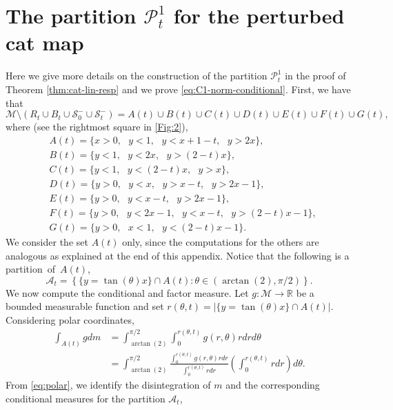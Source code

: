 \documentclass{amsart}
\numberwithin{equation}{section}
\newcommand\cA{{\mathcal A}}
\newcommand\cM{{\mathcal M}}
\newcommand\cS{{\mathcal S}}
\newcommand\bR{{\mathbb R}}
\begin{document}
\section{The partition \(\mathscr P_t^1\) for the perturbed cat map} \label{sec:app}
Here we give more details on the construction of the partition \(\mathscr P_t^1\) in the proof of Theorem \ref{thm:cat-lin-resp} and we prove \eqref{eq:C1-norm-conditional}. First, we have that 
\[
\cM \setminus (R_t \cup B_t \cup \cS_0^{-} \cup \cS_t^{-}) = A(t) \cup B(t) \cup C(t) \cup D(t) \cup E(t) \cup F(t) \cup G(t),
\]
where (see the rightmost square in \ref{Fig:2}),
\begin{equation}\label{eq:pedant}
\begin{split}
&A(t) = \{x>0, \text{ } y<1, \text{ } y<x+1-t, \text{ } y>2x\},\\
&B(t) = \{y<1,\text{ } y<2x, \text{ }y > (2-t)x\},\\
&C(t) = \{y<1,\text{ } y<(2-t)x,\text{ } y > x\},\\
&D(t) = \{y>0, \text{ }y< x, \text{ }y > x-t, \text{ }y> 2x-1\},\\
& E(t) = \{y>0, \text{ }y<x-t, \text{ }y>2x-1\},\\
&F(t) = \{y>0, \text{ }y<2x-1, \text{ }y < x-t, \text{ }y >(2-t)x -1\},\\
& G(t) = \{y>0,\text{ }x<1,\text{ } y<(2-t)x-1\}.
\end{split}
\end{equation}
We consider the set \(A(t)\) only, since the computations for the others are analogous as explained at the end of this appendix. Notice that the following is a \mbox{partition of \(A(t)\)},
\[
   \cA_t = \left\{\{y=\tan(\theta) x\}\cap A(t): \theta \in (\arctan(2), \pi/2)\right\}.
\]
We now compute the conditional and factor measure. Let \(g: \cM \to \bR\) be a bounded measurable function and set \(r(\theta, t) = |\{y = \tan(\theta)x\} \cap A(t)|\). Considering polar coordinates,
\begin{equation}\label{eq:polar}
\begin{split}
    \int_{A(t)}gdm &= \int_{\arctan(2)}^{\pi/2} \int_{0}^{r(\theta,t)} g(r,\theta)rdrd\theta \\
    &= \int_{\arctan(2)}^{\pi/2} \frac{\int_{0}^{r(\theta,t)} g(r,\theta)rdr}{\int_0^{r(\theta,t)} r dr } \left(\int_0^{r(\theta,t)} r dr \right)d\theta.
    \end{split}
\end{equation}
From \eqref{eq:polar}, we identify the disintegration of \(m\) and the corresponding conditional measures for the partition \(\cA_t\), 
\end{document}
